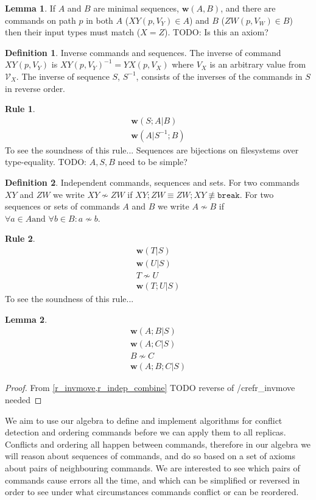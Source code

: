 \documentclass[12pt]{article}
\newcommand{\setvx}[1]{\mathcal{V}_{#1}}
\newcommand{\cbrk}{\mathtt{break}}
\newcommand{\fscommand}[2]{{#1#2}}
\newcommand{\cxy}{\fscommand{X}{Y}}
\newcommand{\cyx}{\fscommand{Y}{X}}
\newcommand{\czw}{\fscommand{Z}{W}}
\newcommand{\nequiv}{\not\equiv}
\newcommand{\indep}{\not\sim}
\newcommand{\works}[1]{{\mathbf{w}}({#1})}
\newcommand{\worksc}[2]{{\mathbf{w}}({#1}|{#2})}
\newcommand{\infer}[2]{\begin{array}{c}{#1}\\\hline{#2}\end{array}}
\newcommand{\inferrr}[4]{\begin{array}{c}{#1}\\{#2}\\{#3}\\\hline{#4}\end{array}}
\theoremstyle{definition}
\newtheorem{mydef}{Definition}
\newtheorem{mylem}{Lemma}
\newtheorem{myrul}{Rule}
\begin{document}
\begin{mylem}\label{worksinputmatch}
If $A$ and $B$ are minimal sequences, $\works{A,B}$,
and there are commands on path $p$ in both $A$ ($\cxy(p, V_Y)\in A$) and $B$ ($\czw(p, V_W)\in B$)
then their input types must match ($X=Z$).
TODO: Is this an axiom?
\end{mylem}

\begin{mydef}{Inverse commands and sequences.}
The inverse of command $\cxy(p,V_Y)$ is $\cxy(p,V_Y)^{-1} = \cyx(p,V_X)$
where $V_X$ is an arbitrary value from $\setvx{X}$.
The inverse of sequence $S$, $S^{-1}$, consists of the inverses of the commands in $S$
in reverse order.
\end{mydef}

\begin{myrul}\label{r_invmove}
\[ \infer{\worksc{S;A}{B}}{\worksc{A}{S^{-1};B}} \]
To see the soundness of this rule...
Sequences are bijections on filesystems over type-equality.
TODO: $A,S,B$ need to be simple?
\end{myrul}

\begin{mydef}{Independent commands, sequences and sets.}
For two commands $\cxy$ and $\czw$ we write $\cxy\indep\czw$ if $\cxy;\czw\equiv\czw;\cxy\nequiv\cbrk$.
For two sequences or sets of commands $A$ and $B$ we write $A\indep B$ if
$\forall a\in A \mbox{and~} \forall b\in B: a\indep b$.
\end{mydef}

\begin{myrul}\label{r_indep_combine}
\[ \inferrr{\worksc{T}{S}}{\worksc{U}{S}}{T\indep U}{\worksc{T;U}{S}} \]
To see the soundness of this rule...
\end{myrul}

\begin{mylem}\label{indep_prefix_combine}
\[ \inferrr{\worksc{A;B}{S}}{\worksc{A;C}{S}}{B\indep C}{\worksc{A;B;C}{S}} \]
\end{mylem}
\begin{proof}
From \cref{r_invmove,r_indep_combine}
TODO reverse of /cref{r_invmove} needed
\end{proof}

We aim to use our algebra to define and implement algorithms for conflict detection
and ordering commands before we can apply them to all replicas.
Conflicts and ordering all happen between commands, therefore in our algebra
we will reason about sequences of commands, 
and do so based on a set of axioms about pairs of neighbouring commands.
We are interested to see which pairs of commands cause errors all the time,
and which can be simplified or reversed
in order to see under what circumstances commands conflict or can be reordered.
\end{document}

